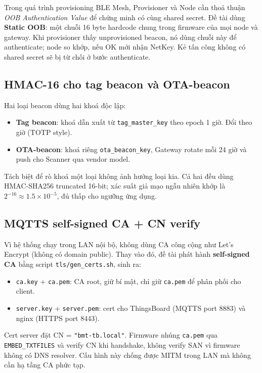 Trong quá trình provisioning BLE Mesh, Provisioner và Node cần thoả thuận \textit{OOB Authentication Value} để chứng minh có cùng shared secret. Đề tài dùng \textbf{Static OOB}: một chuỗi 16 byte hardcode chung trong firmware của mọi node và gateway. Khi provisioner thấy unprovisioned beacon, nó dùng chuỗi này để authenticate; node so khớp, nếu OK mới nhận NetKey. Kẻ tấn công không có shared secret sẽ bị từ chối ở bước authenticate.

\subsection{HMAC-16 cho tag beacon và OTA-beacon}

Hai loại beacon dùng hai khoá độc lập:

\begin{itemize}
    \item \textbf{Tag beacon}: khoá dẫn xuất từ \texttt{tag\_master\_key} theo epoch 1 giờ. Đổi theo giờ (TOTP style).
    \item \textbf{OTA-beacon}: khoá riêng \texttt{ota\_beacon\_key}, Gateway rotate mỗi 24 giờ và push cho Scanner qua vendor model.
\end{itemize}

Tách biệt để rò khoá một loại không ảnh hưởng loại kia. Cả hai đều dùng HMAC-SHA256 truncated 16-bit; xác suất giả mạo ngẫu nhiên khớp là $2^{-16} \approx 1.5 \times 10^{-5}$, đủ thấp cho ngưỡng ứng dụng.

\subsection{MQTTS self-signed CA + CN verify}

Vì hệ thống chạy trong LAN nội bộ, không dùng CA công cộng như Let's Encrypt (không có domain public). Thay vào đó, đề tài phát hành \textbf{self-signed CA} bằng script \texttt{tls/gen\_certs.sh}, sinh ra:

\begin{itemize}
    \item \texttt{ca.key} + \texttt{ca.pem}: CA root, giữ bí mật, chỉ giữ \texttt{ca.pem} để phân phối cho client.
    \item \texttt{server.key} + \texttt{server.pem}: cert cho ThingsBoard (MQTTS port 8883) và nginx (HTTPS port 8443).
\end{itemize}

Cert server đặt CN = \texttt{"bmt-tb.local"}. Firmware nhúng \texttt{ca.pem} qua \texttt{EMBED\_TXTFILES} và verify CN khi handshake, không verify SAN vì firmware không có DNS resolver. Cấu hình này chống được MITM trong LAN mà không cần hạ tầng CA phức tạp.


